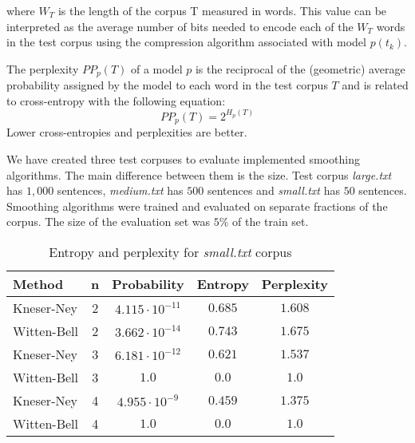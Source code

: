 \documentclass[10pt, a4paper]{article}
\begin{document}
where $W_{T}$ is the length of the corpus T measured in words. This value can be interpreted as the average number of bits needed to encode each of the $W_{T}$ words in the test corpus using the compression algorithm associated with model $p(t_{k})$.

The perplexity $PP_{p}(T)$ of a model $p$ is the reciprocal of the (geometric) average probability assigned by the model to each word in the test corpus $T$ and is related to cross-entropy with the following equation:
\begin{equation}
PP_{p} (T) = 2^{H_{p}(T)}
\end{equation}
Lower cross-entropies and perplexities are better.

We have created three test corpuses to evaluate implemented smoothing algorithms. The main difference between them is the size. Test corpus \textit{large.txt} has $1,000$ sentences, \textit{medium.txt} has $500$ sentences and \textit{small.txt} has $50$ sentences. Smoothing algorithms were trained and evaluated on separate fractions of the corpus. The size of the evaluation set was $5\%$ of the train set. 

\begin{table}[h]
\caption{Entropy and perplexity for \textit{small.txt} corpus}
\label{tab:small}
\begin{center}
\begin{tabular}{lcccc}
\toprule
Method & n & Probability & Entropy & Perplexity \\
\midrule
Kneser-Ney & 2 & $4.115 \cdot 10^{-11}$ & $0.685$ & $1.608$ \\
Witten-Bell & 2 & $3.662 \cdot 10^{-14}$ & $0.743$ & $1.675$ \\

Kneser-Ney & 3 & $6.181 \cdot 10^{-12}$ & $0.621$ & $1.537$ \\
Witten-Bell & 3 & $1.0$ & $0.0$ & $1.0$ \\

Kneser-Ney & 4 & $4.955 \cdot 10^{-9}$ & $0.459$ & $1.375$ \\
Witten-Bell & 4 & $1.0$ & $0.0$ & $1.0$ \\
\bottomrule
\end{tabular}
\end{center}
\end{table}
\end{document}
